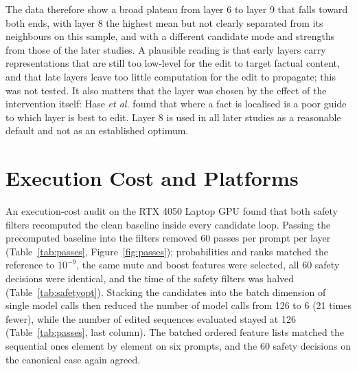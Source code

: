 \documentclass[12pt,a4paper]{report}
\begin{document}
The data therefore show a broad plateau from layer 6 to layer 9 that falls toward both ends, with layer 8 the highest mean but not clearly separated from its neighbours on this sample, and with a different candidate mode and strengths from those of the later studies. A plausible reading is that early layers carry representations that are still too low-level for the edit to target factual content, and that late layers leave too little computation for the edit to propagate; this was not tested. It also matters that the layer was chosen by the effect of the intervention itself: Hase \textit{et al.} \cite{r30} found that where a fact is localised is a poor guide to which layer is best to edit. Layer 8 is used in all later studies as a reasonable default and not as an established optimum.

\section{Execution Cost and Platforms}\label{sec:cost}

An execution-cost audit on the RTX 4050 Laptop GPU found that both safety filters recomputed the clean baseline inside every candidate loop. Passing the precomputed baseline into the filters removed 60 passes per prompt per layer (Table~\ref{tab:passes}, Figure~\ref{fig:passes}); probabilities and ranks matched the reference to $10^{-9}$, the same mute and boost features were selected, all 60 safety decisions were identical, and the time of the safety filters was halved (Table~\ref{tab:safetyopt}). Stacking the candidates into the batch dimension of single model calls then reduced the number of model calls from 126 to 6 (21 times fewer), while the number of edited sequences evaluated stayed at 126 (Table~\ref{tab:passes}, last column). The batched ordered feature lists matched the sequential ones element by element on six prompts, and the 60 safety decisions on the canonical case again agreed.
\end{document}
